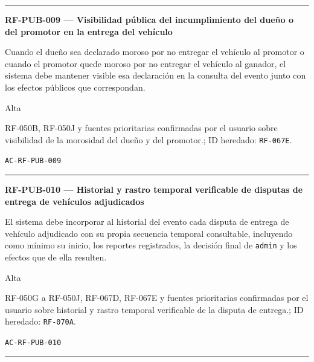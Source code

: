 \documentclass[10pt,letterpaper]{article}
\begin{document}
\vspace{0.25em}\hrule\vspace{0.65em}
\noindent\textbf{RF-PUB-009 --- Visibilidad pública del incumplimiento del dueño o del promotor en la entrega del vehículo}\par
\begin{description}[style=nextline,leftmargin=3.15cm,labelwidth=2.8cm,font=\normalfont\bfseries]
\item[Obligación] Cuando el dueño sea declarado moroso por no entregar el vehículo al promotor o cuando el promotor quede moroso por no entregar el vehículo al ganador, el sistema debe mantener visible esa declaración en la consulta del evento junto con los efectos públicos que correspondan.
\item[Prioridad] Alta
\item[Procedencia] RF-050B, RF-050J y fuentes prioritarias confirmadas por el usuario sobre visibilidad de la morosidad del dueño y del promotor.; ID heredado: \texttt{RF-067E}.
\item[Verificación] \texttt{AC-RF-PUB-009}
\end{description}
\vspace{0.25em}\hrule\vspace{0.65em}
\noindent\textbf{RF-PUB-010 --- Historial y rastro temporal verificable de disputas de entrega de vehículos adjudicados}\par
\begin{description}[style=nextline,leftmargin=3.15cm,labelwidth=2.8cm,font=\normalfont\bfseries]
\item[Obligación] El sistema debe incorporar al historial del evento cada disputa de entrega de vehículo adjudicado con su propia secuencia temporal consultable, incluyendo como mínimo su inicio, los reportes registrados, la decisión final de \texttt{admin} y los efectos que de ella resulten.
\item[Prioridad] Alta
\item[Procedencia] RF-050G a RF-050J, RF-067D, RF-067E y fuentes prioritarias confirmadas por el usuario sobre historial y rastro temporal verificable de la disputa de entrega.; ID heredado: \texttt{RF-070A}.
\item[Verificación] \texttt{AC-RF-PUB-010}
\end{description}
\vspace{0.25em}\hrule\vspace{0.65em}
\end{document}
